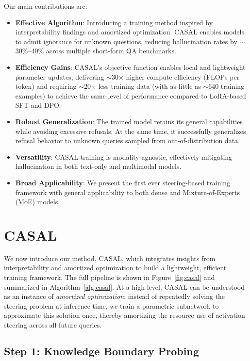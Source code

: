 Our main contributions are:
\begin{itemize}
    \item \textbf{Effective Algorithm}: Introducing a training method inspired by interpretability findings and amortized optimization. CASAL enables models to admit ignorance for unknown questions, reducing hallucination rates by $\sim$30\%--40\% across multiple short-form QA benchmarks.
    \item \textbf{Efficiency Gains}: CASAL's objective function enables local and lightweight parameter updates, delivering $\sim$30$\times$ higher compute efficiency (FLOPs per token) and requiring $\sim$20$\times$ less training data (with as little as $\sim$640 training examples) to achieve the same level of performance compared to LoRA-based SFT and DPO.
    \item \textbf{Robust Generalization}: The trained model retains its general capabilities while avoiding excessive refusals. At the same time, it successfully generalizes refusal behavior to unknown queries sampled from out-of-distribution data.
    \item \textbf{Versatility}: CASAL training is modality-agnostic, effectively mitigating hallucination in both text-only and multimodal models.
    \item \textbf{Broad Applicability}: We present the first ever steering-based training framework with general applicability to both dense and Mixture-of-Experts (MoE) models.
\end{itemize}

\section{CASAL}

We now introduce our method, CASAL, which integrates insights from interpretability and amortized optimization to build a lightweight, efficient training framework. The full pipeline is shown in Figure~\ref{fig:casal} and summarized in Algorithm~\ref{alg:casal}. At a high level, CASAL can be understood as an instance of \textit{amortized optimization}: instead of repeatedly solving the steering problem at inference time, we train a parametric subnetwork to approximate this solution once, thereby amortizing the resource use of activation steering across all future queries.

\subsection{Step 1: Knowledge Boundary Probing}

